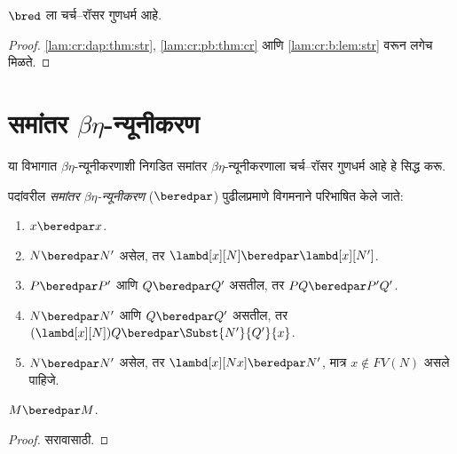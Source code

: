 \begin{thm}\label{lam:cr:b:thm:cr}
  $\bred$ ला चर्च–रॉसर गुणधर्म आहे.
\end{thm}

\begin{proof}
  \ref{lam:cr:dap:thm:str}, \ref{lam:cr:pb:thm:cr} आणि
  \ref{lam:cr:b:lem:str} वरून लगेच मिळते.
\end{proof}












\section{समांतर $\beta\eta$-न्यूनीकरण}\label{lam:cr:pbe:sec}

या विभागात $\beta\eta$-न्यूनीकरणाशी निगडित समांतर
$\beta\eta$-न्यूनीकरणाला चर्च–रॉसर गुणधर्म आहे हे सिद्ध करू.

\begin{defn} \label{lam:cr:pbe:defn:beredpar}
  पदांवरील \emph{समांतर $\beta\eta$-न्यूनीकरण}
  ($\beredpar$) पुढीलप्रमाणे विगमनाने परिभाषित केले जाते:
  \begin{enumerate}
    \item \label{lam:cr:pbe:defn:beredpar1} $x \beredpar x$.
    \item \label{lam:cr:pbe:defn:beredpar2} $N \beredpar N'$ असेल, तर $\lambd[x][N] \beredpar
      \lambd[x][N']$.
    \item \label{lam:cr:pbe:defn:beredpar3} $P \beredpar P'$ आणि $Q \beredpar Q'$ असतील, तर $PQ \beredpar
      P'Q'$.
    \item \label{lam:cr:pbe:defn:beredpar4} $N \beredpar N'$ आणि $Q \beredpar Q'$ असतील, तर
      $(\lambd[x][N])Q \beredpar \Subst{N'}{Q'}{x}$.
    \item \label{lam:cr:pbe:defn:beredpar5} $N \beredpar N'$ असेल, तर $\lambd[x][Nx]
      \beredpar N'$, मात्र $x \notin FV(N)$ असले पाहिजे.
  \end{enumerate}
\end{defn}

\begin{thm}\label{lam:cr:pbe:thm:refl}
  $M \beredpar M$.
\end{thm}

\begin{proof}
  सरावासाठी.
\end{proof}

